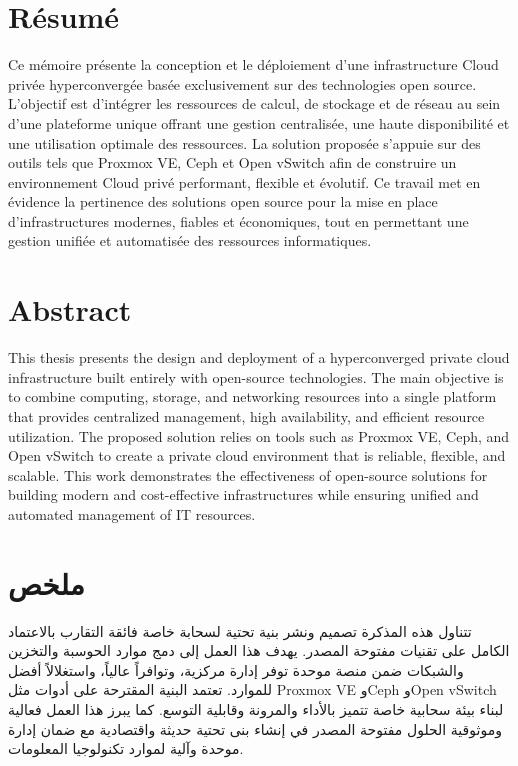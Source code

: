 \thispagestyle{empty}

\section*{Résumé}

Ce mémoire présente la conception et le déploiement d’une infrastructure Cloud privée hyperconvergée basée exclusivement sur des technologies open source. L’objectif est d’intégrer les ressources de calcul, de stockage et de réseau au sein d’une plateforme unique offrant une gestion centralisée, une haute disponibilité et une utilisation optimale des ressources. La solution proposée s’appuie sur des outils tels que Proxmox VE, Ceph et Open vSwitch afin de construire un environnement Cloud privé performant, flexible et évolutif. Ce travail met en évidence la pertinence des solutions open source pour la mise en place d’infrastructures modernes, fiables et économiques, tout en permettant une gestion unifiée et automatisée des ressources informatiques.

\vspace{0.5cm}

\section*{Abstract}

This thesis presents the design and deployment of a hyperconverged private cloud infrastructure built entirely with open-source technologies. The main objective is to combine computing, storage, and networking resources into a single platform that provides centralized management, high availability, and efficient resource utilization. The proposed solution relies on tools such as Proxmox VE, Ceph, and Open vSwitch to create a private cloud environment that is reliable, flexible, and scalable. This work demonstrates the effectiveness of open-source solutions for building modern and cost-effective infrastructures while ensuring unified and automated management of IT resources.

\vspace{0.5cm}

\section*{ملخص}

تتناول هذه المذكرة تصميم ونشر بنية تحتية لسحابة خاصة فائقة التقارب بالاعتماد الكامل على تقنيات مفتوحة المصدر. يهدف هذا العمل إلى دمج موارد الحوسبة والتخزين والشبكات ضمن منصة موحدة توفر إدارة مركزية، وتوافراً عالياً، واستغلالاً أفضل للموارد. تعتمد البنية المقترحة على أدوات مثل Proxmox VE وCeph وOpen vSwitch لبناء بيئة سحابية خاصة تتميز بالأداء والمرونة وقابلية التوسع. كما يبرز هذا العمل فعالية وموثوقية الحلول مفتوحة المصدر في إنشاء بنى تحتية حديثة واقتصادية مع ضمان إدارة موحدة وآلية لموارد تكنولوجيا المعلومات.
